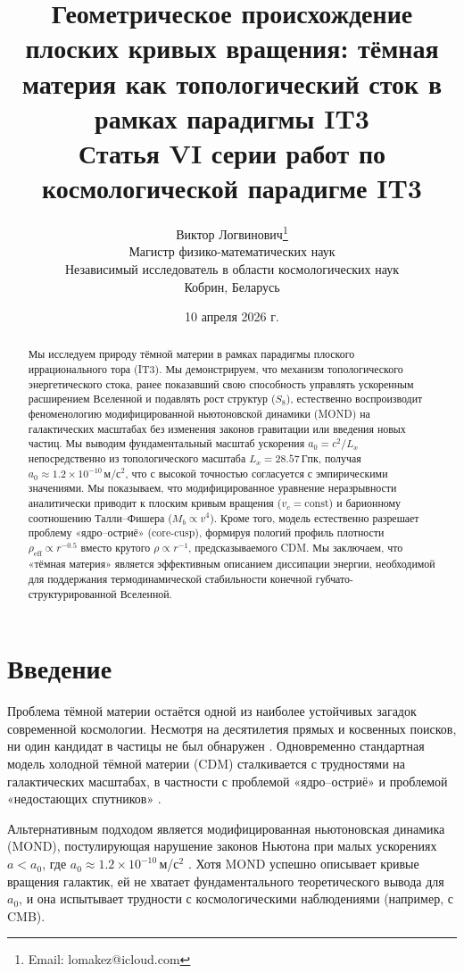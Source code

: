 \documentclass[12pt,a4paper]{article}
\title{\textbf{Геометрическое происхождение плоских кривых вращения: тёмная материя как топологический сток в рамках парадигмы IT3}\\[0.5cm]
\large Статья VI серии работ по космологической парадигме IT3}
\author{Виктор Логвинович\thanks{Email: lomakez@icloud.com}\\
Магистр физико-математических наук\\
Независимый исследователь в области космологических наук\\
Кобрин, Беларусь}
\date{10 апреля 2026 г.}
\begin{document}
\maketitle

\begin{abstract}
Мы исследуем природу тёмной материи в рамках парадигмы плоского иррационального тора (IT3). Мы демонстрируем, что механизм топологического энергетического стока, ранее показавший свою способность управлять ускоренным расширением Вселенной и подавлять рост структур ($S_8$), естественно воспроизводит феноменологию модифицированной ньютоновской динамики (MOND) на галактических масштабах без изменения законов гравитации или введения новых частиц. Мы выводим фундаментальный масштаб ускорения $a_0 = c^2/L_x$ непосредственно из топологического масштаба $L_x = 28.57$\,Гпк, получая $a_0 \approx 1.2 \times 10^{-10}$\,м/с$^2$, что с высокой точностью согласуется с эмпирическими значениями. Мы показываем, что модифицированное уравнение неразрывности аналитически приводит к плоским кривым вращения ($v_c = \mathrm{const}$) и барионному соотношению Талли–Фишера ($M_b \propto v^4$). Кроме того, модель естественно разрешает проблему «ядро–остриё» (core-cusp), формируя пологий профиль плотности $\rho_{\mathrm{eff}} \propto r^{-0.5}$ вместо крутого $\rho \propto r^{-1}$, предсказываемого CDM. Мы заключаем, что «тёмная материя» является эффективным описанием диссипации энергии, необходимой для поддержания термодинамической стабильности конечной губчато-структурированной Вселенной.
\end{abstract}

\section{Введение}

Проблема тёмной материи остаётся одной из наиболее устойчивых загадок современной космологии. Несмотря на десятилетия прямых и косвенных поисков, ни один кандидат в частицы не был обнаружен \citep{Bertone2018}. Одновременно стандартная модель холодной тёмной материи (CDM) сталкивается с трудностями на галактических масштабах, в частности с проблемой «ядро–остриё» и проблемой «недостающих спутников» \citep{Bullock2017}.

Альтернативным подходом является модифицированная ньютоновская динамика (MOND), постулирующая нарушение законов Ньютона при малых ускорениях $a < a_0$, где $a_0 \approx 1.2 \times 10^{-10}$\,м/с$^2$ \citep{Milgrom1983}. Хотя MOND успешно описывает кривые вращения галактик, ей не хватает фундаментального теоретического вывода для $a_0$, и она испытывает трудности с космологическими наблюдениями (например, с CMB).
\end{document}
